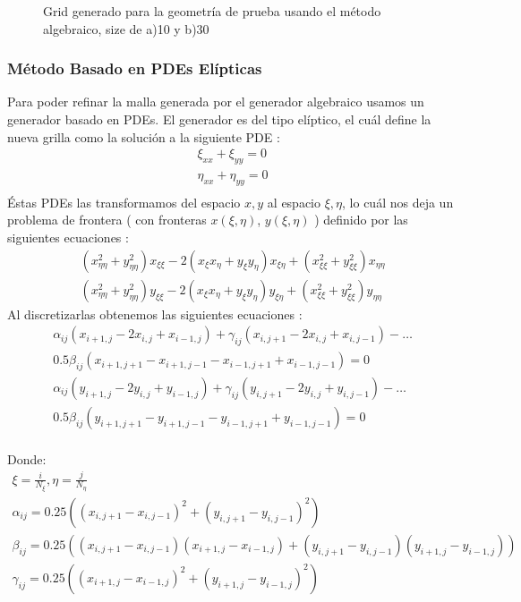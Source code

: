 \documentclass[11pt,letterpaper]{article}
\begin{document}
\begin{figure}[H]
\begin{minipage}{.49\linewidth}
			\end{minipage}
			\caption{Grid generado para la geometr\'ia de prueba usando el m\'etodo algebraico, size de a)10 y b)30}
			\label{fig:img_grid_algebraic}
		\end{figure}
\subsubsection{Método Basado en PDEs Elípticas}
Para poder refinar la malla generada por el generador algebraico usamos un generador basado en PDEs. El generador es del tipo el\'iptico, el cu\'al define la nueva grilla como la soluci\'on a la siguiente PDE :
		\begin{gather*}
			\xi_{xx} + \xi_{yy} = 0 \\
			\eta_{xx} + \eta_{yy} = 0 \\
		\end{gather*}
		\'Estas PDEs las transformamos del espacio $x,y$ al espacio $\xi, \eta$, lo cu\'al nos deja un problema de frontera ( con fronteras $x(\xi,\eta)$, $y(\xi,\eta)$ ) definido por las siguientes ecuaciones :
		\begin{gather*}
			( x_{\eta \eta}^{2} + y_{\eta \eta}^{2} )x_{\xi \xi} 
				- 2 ( x_{\xi} x_{\eta} + y_{\xi} y_{\eta} ) x_{\xi \eta}
				+ ( x_{\xi \xi}^{2} + y_{\xi \xi}^{2} )x_{\eta \eta} 
			\\
			( x_{\eta \eta}^{2} + y_{\eta \eta}^{2} )y_{\xi \xi} 
				- 2 ( x_{\xi} x_{\eta} + y_{\xi} y_{\eta} ) y_{\xi \eta}
				+ ( x_{\xi \xi}^{2} + y_{\xi \xi}^{2} )y_{\eta \eta} 
		\end{gather*}
		Al discretizarlas obtenemos las siguientes ecuaciones :
		\begin{gather*}
			\alpha_{ij} ( x_{i+1,j} - 2 x_{i,j} + x_{i-1,j} ) + \gamma_{ij} ( x_{i, j + 1} - 2 x_{i, j} + x_{i,j-1} ) - \hdots \\
				 0.5 \beta_{ij} ( x_{i+1,j+1} - x_{i+1,j-1} - x_{i-1,j+1} + x_{i-1,j-1} ) = 0
			\\
			\alpha_{ij} ( y_{i+1,j} - 2 y_{i,j} + y_{i-1,j} ) + \gamma_{ij} ( y_{i, j + 1} - 2 y_{i, j} + y_{i,j-1} ) - \hdots \\
				 0.5 \beta_{ij} ( y_{i+1,j+1} - y_{i+1,j-1} - y_{i-1,j+1} + y_{i-1,j-1} ) = 0
		\end{gather*}
		\\
		Donde:
		\begin{gather*}
			 \xi = \frac{i}{N_{\xi}},\eta = \frac{j}{N_{\eta}}
			 \\
			 \alpha_{ij} = 0.25 ( ( x_{i,j+1} - x_{i,j-1} )^{2} + (y_{i,j+1} - y_{i,j-1})^{2} )
			 \\
			 \beta_{ij} = 0.25 ( ( x_{i,j+1} - x_{i,j-1} ) ( x_{i+1,j} - x_{i-1,j} ) + ( y_{i,j+1} - y_{i,j-1} ) ( y_{i+1,j} - y_{i-1,j} ) )
			 \\
			 \gamma_{ij} = 0.25 ( ( x_{i+1,j} - x_{i-1,j} )^{2} + (y_{i+1,j} - y_{i-1,j})^{2} )
		\end{gather*}
\end{document}

